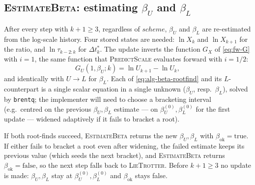 \subsection{\textsc{EstimateBeta}: estimating \texorpdfstring{$\beta_U$}{beta\_U} and \texorpdfstring{$\beta_L$}{beta\_L}}\label{ssec:alg-beta-estimation}
After every step with $k+1 \geq 3$, regardless of $\mathit{scheme}$, $\beta_U$
and $\beta_L$ are re-estimated from the log-scale history. Four stored states
are needed: $\ln X_k$ and $\ln X_{k+1}$ for the ratio, and $\ln \tau_{k-2:k}$
for $\Delta t_k^*$. The update inverts the function $G_X$ of \eqref{eq:fw-G}
with $i = 1$, the same function that \textsc{PredictScale} evaluates forward
with $i = 1/2$:
\begin{equation}\label{eq:alg-beta-rootfind}
  G_U(1, \beta_U; k) = \ln U_{k+1} - \ln U_k,
\end{equation}
and identically with $U \to L$ for $\beta_L$. Each of
\eqref{eq:alg-beta-rootfind} and its $L$-counterpart is a single scalar
equation in a single unknown ($\beta_U$, resp.\ $\beta_L$), solved by
\texttt{brentq}; the implementer will need to choose a bracketing interval
(e.g.\ centred on the previous $\beta_U, \beta_L$ estimate --- on
$\beta_U^{(0)}, \beta_L^{(0)}$ for the first update --- widened adaptively if
it fails to bracket a root).

If both root-finds succeed, \textsc{EstimateBeta} returns the new
$\beta_U, \beta_L$ with $\beta_{\mathrm{ok}} = \text{true}$. If either fails
to bracket a root even after widening, the failed estimate keeps its previous
value (which seeds the next bracket), and \textsc{EstimateBeta} returns
$\beta_{\mathrm{ok}} = \text{false}$, so the next step falls back to
\textsc{LieTrotter}. Before $k+1 \geq 3$ no update is made: $\beta_U, \beta_L$
stay at $\beta_U^{(0)}, \beta_L^{(0)}$ and $\beta_{\mathrm{ok}}$ stays false.
